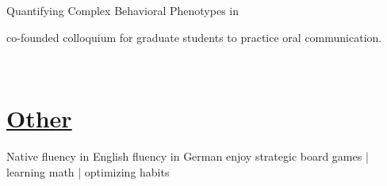 \documentclass[]{winter-resume-openfont}
\begin{document}
\begin{minipage}[t]{0.65\textwidth}
\begin{tightemize}
\item {} Quantifying Complex Behavioral Phenotypes in 

\item co-founded colloquium for graduate students to practice oral communication.
\end{tightemize}

\sectionsep

 \\
\sectionsep

\section{\underline{Other}}
Native fluency in English \textbullet{} fluency in German \textbullet{} enjoy strategic board games | learning math | optimizing habits




\end{minipage} 
\hfill
\end{document}
